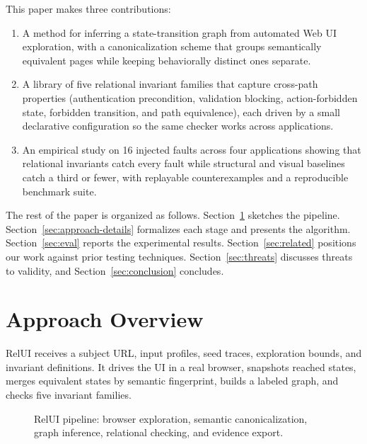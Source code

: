 \documentclass[sigconf,nonacm]{acmart}
\newcommand{\RelUI}{RelUI\xspace}
\begin{document}
This paper makes three contributions:
\begin{enumerate}
  \item A method for inferring a state-transition graph from automated Web UI exploration, with a canonicalization scheme that groups semantically equivalent pages while keeping behaviorally distinct ones separate.
  \item A library of five relational invariant families that capture cross-path properties (authentication precondition, validation blocking, action-forbidden state, forbidden transition, and path equivalence), each driven by a small declarative configuration so the same checker works across applications.
  \item An empirical study on 16 injected faults across four applications showing that relational invariants catch every fault while structural and visual baselines catch a third or fewer, with replayable counterexamples and a reproducible benchmark suite.
\end{enumerate}

The rest of the paper is organized as follows. Section~\ref{sec:approach-overview} sketches the pipeline. Section~\ref{sec:approach-details} formalizes each stage and presents the algorithm. Section~\ref{sec:eval} reports the experimental results. Section~\ref{sec:related} positions our work against prior testing techniques. Section~\ref{sec:threats} discusses threats to validity, and Section~\ref{sec:conclusion} concludes.

\section{Approach Overview}\label{sec:approach-overview}
\RelUI receives a subject URL, input profiles, seed traces, exploration bounds, and invariant definitions. It drives the UI in a real browser, snapshots reached states, merges equivalent states by semantic fingerprint, builds a labeled graph, and checks five invariant families.

\begin{figure}[t]
  \centering
  \caption{\RelUI pipeline: browser exploration, semantic canonicalization, graph inference, relational checking, and evidence export.}
  \label{fig:pipeline}
\end{figure}
\end{document}
